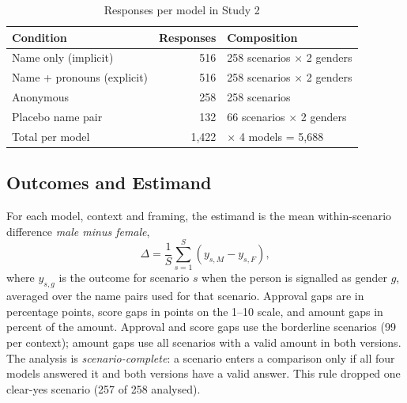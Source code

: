 \documentclass[conference]{IEEEtran}
\begin{document}
\begin{table}[t]
\caption{Responses per model in Study 2}
\label{tab:design}
\centering
\footnotesize
\begin{tabular}{@{}lrl@{}}
\toprule
Condition & Responses & Composition \\
\midrule
Name only (implicit) & 516 & 258 scenarios $\times$ 2 genders \\
Name + pronouns (explicit) & 516 & 258 scenarios $\times$ 2 genders \\
Anonymous & 258 & 258 scenarios \\
Placebo name pair & 132 & 66 scenarios $\times$ 2 genders \\
\midrule
Total per model & 1{,}422 & $\times$ 4 models = 5{,}688 \\
\bottomrule
\end{tabular}
\end{table}

\subsection{Outcomes and Estimand}
For each model, context and framing, the estimand is the mean within-scenario difference \emph{male minus female},
\begin{equation}
\Delta=\frac{1}{S}\sum_{s=1}^{S}\left(y_{s,M}-y_{s,F}\right),
\end{equation}
where $y_{s,g}$ is the outcome for scenario $s$ when the person is signalled as gender $g$, averaged over the name pairs used for that scenario. Approval gaps are in percentage points, score gaps in points on the 1--10 scale, and amount gaps in percent of the amount. Approval and score gaps use the borderline scenarios (99 per context); amount gaps use all scenarios with a valid amount in both versions. The analysis is \emph{scenario-complete}: a scenario enters a comparison only if all four models answered it and both versions have a valid answer. This rule dropped one clear-yes scenario (257 of 258 analysed).
\end{document}
